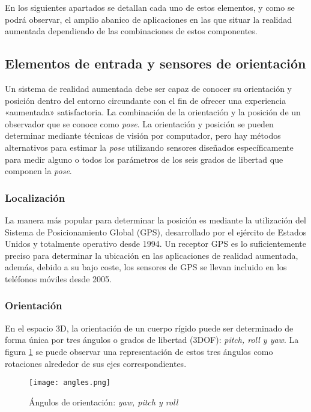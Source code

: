 En los siguientes apartados se detallan cada uno de estos elementos, y como se podrá observar, el amplio abanico de aplicaciones en las que situar la realidad aumentada dependiendo de las combinaciones de estos componentes.

\subsection{Elementos de entrada y sensores de orientación}
Un sistema de realidad aumentada debe ser capaz de conocer su orientación y posición dentro del entorno circundante con el fin de ofrecer una experiencia «aumentada» satisfactoria. La combinación de la orientación y la posición de un observador que se conoce como \emph{pose}. La orientación y posición se pueden determinar mediante técnicas de visión por computador, pero hay métodos alternativos para estimar la \emph{pose} utilizando sensores diseñados específicamente para medir alguno o todos los parámetros de los seis grados de libertad que componen la \emph{pose}.

\subsubsection{Localización}
La manera más popular para determinar la posición es mediante la utilización del Sistema de Posicionamiento Global (\acs{GPS}), desarrollado por el ejército de Estados Unidos y totalmente operativo desde 1994. 
Un receptor \acs{GPS} es lo suficientemente preciso para determinar la ubicación en las aplicaciones de realidad aumentada, además, debido a su bajo coste, los sensores de \acs{GPS} se llevan incluido en los teléfonos móviles desde 2005.

\subsubsection{Orientación}
En el espacio 3D, la orientación de un cuerpo rígido puede ser determinado de forma única por tres ángulos o grados de libertad (3DOF): \emph{pitch, roll y yaw}. La figura \ref{fig:ángulos}  se puede observar una representación de estos tres ángulos como rotaciones alrededor de sus ejes correspondientes. 

\begin{figure}[b]
  \centering
  \texttt{[image: angles.png]}
  \caption{Ángulos de orientación: \emph{yaw, pitch y roll}}
  \label{fig:ángulos}
\end{figure}

